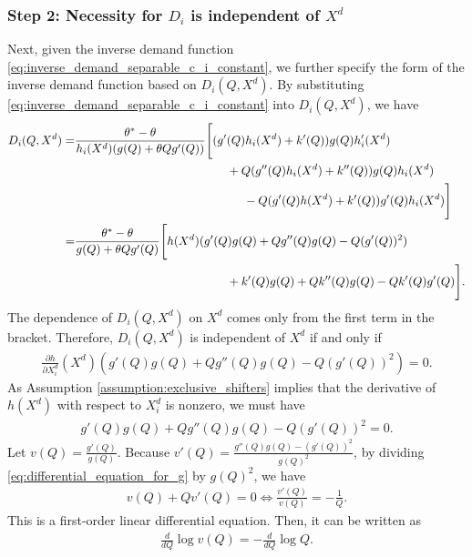 \documentclass[11pt, a4paper]{article}
\theoremstyle{remark}
\begin{document}
\subsubsection*{Step 2: Necessity for $D_i$ is independent of $X^{d}$}
Next, given the inverse demand function \eqref{eq:inverse_demand_separable_c_i_constant}, we further specify the form of the inverse demand function based on $D_i(Q, X^{d})$.
By substituting \eqref{eq:inverse_demand_separable_c_i_constant} into $D_i(Q, X^{d})$, we have
\begin{align}
    D_i(Q, X^{d}) = &\frac{\theta^{*} - \theta}{h_i(X^{d})(g(Q) + \theta Q g'(Q))}\Bigg[
    (g'(Q)h_i(X^{d}) + k'(Q) )g(Q)h_i'(X^{d})\\
    & \hspace{4.5cm} + Q(g''(Q)h_i(X^{d}) + k''(Q))g(Q)h_i(X^{d}) \\
    &\hspace{5cm} - Q(g'(Q)h(X^{d}) + k'(Q))g'(Q)h_i(X^{d})\Bigg]\\
    =&  \frac{\theta^{*} - \theta}{g(Q) + \theta Q g'(Q)}\Bigg[h(X^{d})(g'(Q)g(Q) + Qg{''}(Q)g(Q) - Q (g'(Q))^{2})\\
    & \hspace{4.5cm} + k'(Q)g(Q) + Qk''(Q)g(Q) - Qk'(Q)g'(Q)\Bigg].
\end{align}
The dependence of $D_i(Q, X^{d})$ on $X^{d}$ comes only from the first term in the bracket.
Therefore, $D_i(Q, X^{d})$ is independent of $X^{d}$ if and only if
\begin{align}
    \frac{\partial h}{\partial X^{d}_i}(X^{d})(g'(Q)g(Q) + Qg{''}(Q)g(Q) - Q (g'(Q))^{2}) = 0.
\end{align}
As Assumption \ref{assumption:exclusive_shifters} implies that the derivative of $h(X^{d})$ with respect to $X^{d}_i$ is nonzero, we must have 
\begin{align}
    g'(Q)g(Q) + Qg{''}(Q)g(Q) - Q (g'(Q))^{2} = 0. \label{eq:differential_equation_for_g}
\end{align}
Let $v(Q) = \frac{g'(Q)}{g(Q)}$.
Because $v'(Q) = \frac{g''(Q)g(Q) - (g'(Q))^2}{g(Q)^2}$, by dividing \eqref{eq:differential_equation_for_g} by $g(Q)^2$, we have
\begin{align}
    v(Q) + Qv'(Q) = 0 \Longleftrightarrow \frac{v'(Q)}{v(Q)} = -\frac{1}{Q}.
\end{align}
This is a first-order linear differential equation.
Then, it can be written as
\begin{align}
    \frac{d }{d Q}\log v(Q) = -\frac{d}{dQ}\log Q.
\end{align}
\end{document}
